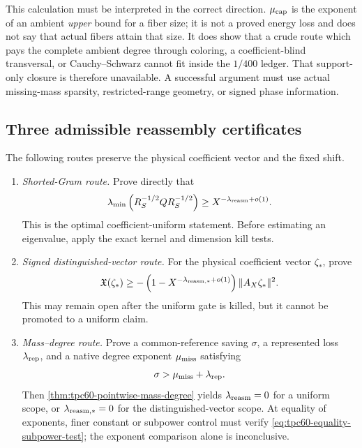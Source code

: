 This calculation must be interpreted in the correct direction.
\(\mu_{\rm cap}\) is the exponent of an ambient \emph{upper} bound for a
fiber size; it is not a proved energy loss and does not say that actual
fibers attain that size.  It does show that a crude route which pays the
complete ambient degree through coloring, a coefficient-blind transversal,
or Cauchy--Schwarz cannot fit inside the \(1/400\) ledger.  That
support-only closure is therefore unavailable.  A successful argument must
use actual missing-mass sparsity, restricted-range geometry, or signed
phase information.

\subsection{Three admissible reassembly certificates}

The following routes preserve the physical coefficient vector and the
fixed shift.

\begin{enumerate}[leftmargin=2.3em]
 \item \emph{Shorted-Gram route.}  Prove directly that
 \begin{equation}
  \lambda_{\min}\left(
   R_S^{-1/2}Q R_S^{-1/2}
  \right)
  \ge X^{-\lambda_{\rm reasm}+o(1)}.
  \label{eq:tpc60-route-shorted-Gram}
 \end{equation}
 This is the optimal coefficient-uniform statement.  Before estimating an
 eigenvalue, apply the exact kernel and dimension kill tests.

 \item \emph{Signed distinguished-vector route.}  For the physical
 coefficient vector \(\zeta_*\), prove
 \begin{equation}
  \mathfrak X(\zeta_*)
  \ge-\left(1-X^{-\lambda_{\rm reasm,*}+o(1)}\right)
       \|A_X\zeta_*\|^2.
  \label{eq:tpc60-route-signed}
 \end{equation}
 This may remain open after the uniform gate is killed, but it cannot be
 promoted to a uniform claim.

 \item \emph{Mass--degree route.}  Prove a common-reference saving
 \(\sigma\), a represented loss \(\lambda_{\rm rep}\), and a native degree
 exponent \(\mu_{\rm miss}\) satisfying
 \begin{equation}
  \sigma>\mu_{\rm miss}+\lambda_{\rm rep}.
  \label{eq:tpc60-route-mass-degree}
 \end{equation}
 Then \cref{thm:tpc60-pointwise-mass-degree} yields
 \(\lambda_{\rm reasm}=0\) for a uniform scope, or
 \(\lambda_{\rm reasm,*}=0\) for the distinguished-vector scope.  At
 equality of exponents,
 finer constant or subpower control must verify
 \eqref{eq:tpc60-equality-subpower-test}; the exponent comparison alone is
 inconclusive.
\end{enumerate}

